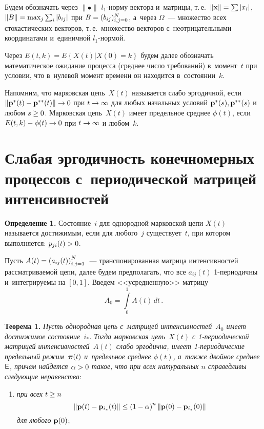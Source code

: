 \begin{multicols}{2}
Будем обозначать через $\|\bullet\|$ $l_1$-нор\-му вектора 
и~матрицы, т.\,е.\ $\|{\bf x}\|\hm=\sum|x_i|$, $\|B\| \hm= \max\nolimits_j 
\sum\nolimits_i
|b_{ij}|$ при $B \hm= (b_{ij})_{i,j=0}^{N}$, а~через $\Omega$~---
множество всех стохастических векторов, т.\,е.\ множество векторов 
с~неотрицательными координатами и~единичной $l_1$-нор\-мой.


Через $E(t,k) = E\left\{X(t)\left|X(0)=k\right.\right\}$ будем далее
обозначать математическое ожидание процесса (среднее число
требований) в~момент~$t$ при условии, что в~нулевой момент времени
он находится в~со\-сто\-янии~$k$.

Напомним, что марковская цепь~$X(t)$ называется слабо эргодичной,
если $\| {\bf p^*}(t) \hm- {\bf p^{**}}(t) \| \hm\to 0 $ при $t \hm\to
\infty$ для любых начальных условий ${\bf p^*}(s), {\bf p^{**}}(s)$
и любом $ s \hm\ge 0$. Марковская цепь~$X(t)$ имеет предельное среднее
$\phi (t)$, если $E(t,k)\hm - \phi (t) \hm\to 0$ при $t \hm\to \infty$ и
любом~$k$.

\vspace*{-6pt}

\section{Слабая эргодичность конечномерных процессов с~периодической 
матрицей интенсивностей}

\vspace*{-2pt}

\noindent
\textbf{Определение 1.}
Состояние~$i$ для однородной марковской цепи $X(t)$ называется
достижимым, если для любого~$j$ существует~$t$, при котором
выполняется: $p_{ji}(t)\hm>0$.



\smallskip

Пусть $A(t) \hm= \left(a_{ij}(t)\right)_{i,j=1}^N$~--- транспонированная
матрица интенсивностей рассматриваемой цепи, далее будем предполагать,
что все $a_{ij}(t)$ 1-пе\-рио\-дич\-ны и~интегрируемы на $[0,1]$. Введем
<<усредненную>> матрицу
\begin{equation*}
A_0 = \int\limits_{0}^{1} A(t)\,dt\,.
\end{equation*}


\noindent
\textbf{Теорема 1.}
\textit{Пусть однородная цепь с~матрицей интенсивностей~$A_0$
имеет достижимое состояние~$i_*$. Тогда марковская цепь~$X(t)$ с
1-пе\-рио\-ди\-че\-ской мат\-ри\-цей интенсивностей~$A(t)$ слабо эргодична,
имеет 1-пе\-рио\-ди\-че\-ские предельный режим~$\boldsymbol{\pi} (t)$ и~предельное
среднее $\phi (t)$, а~также двойное среднее ${\sf E}$, причем
найдется $\alpha \hm>0$ такое, что при всех натуральных $n$ справедливы
следующие неравенства}:
\begin{enumerate}[(1)]
\item \textit{при всех} $t \hm\ge n$
\begin{equation}
\|{\bf p}(t) - \mathbf{p}_{i_*}(t)\| \le \left(1-\alpha\right)^n\|{\bf
p}(0) - \mathbf{p}_{i_*}(0)\| 
\label{ch311}
\end{equation}
\textit{для любого} ${\bf p}(0)$;


\end{enumerate}
\end{multicols}
